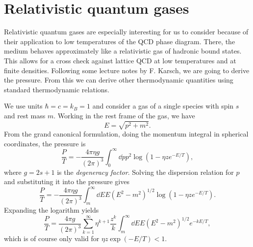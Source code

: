 \section{Relativistic quantum gases}

Relativistic quantum gases are especially interesting for us
to consider because of their
application to low temperatures of the QCD phase diagram. There, the medium
behaves approximately like a relativistic gas of hadronic bound states.
This allows for a cross check against lattice QCD at low temperatures
and at finite densities. Following some lecture notes by F. Karsch,
we are going to derive the
pressure. From this we can derive other thermodynamic quantities
using standard thermodynamic relations.

We use units $\hbar=c=k_B=1$ and consider a gas of a single species
with spin $s$ and rest mass $m$. Working in the rest frame of the gas,
we have
\begin{equation}\label{eq:dispersion}
  E=\sqrt{p^2+m^2}.  
\end{equation}
From the grand canonical formulation,
doing the momentum integral in spherical coordinates, the pressure is
\begin{equation}
  \frac{P}{T}=-\frac{4\pi\eta g}{(2\pi)^3}\int_0^\infty 
      \dd{p}p^2\log\left(1-\eta z e^{-E/T}\right),
\end{equation}
where $g=2s+1$ is the {\it degeneracy factor}. 
Solving the dispersion relation
for $p$ and substituting it into the pressure gives
\begin{equation}
  \frac{P}{T}=-\frac{4\pi\eta g}{(2\pi)^3}\int_m^\infty 
      \dd{E}E\left(E^2-m^2\right)^{1/2}\log\left(1-\eta z e^{-E/T}\right).
\end{equation}
Expanding the logarithm yields
\begin{equation}\label{eq:pressE}
  \frac{P}{T}=\frac{4\pi g}{(2\pi)^3}\sum_{k=1}^\infty\eta^{k+1}\frac{z^k}{k}\int_m^\infty 
      \dd{E}E\left(E^2-m^2\right)^{1/2}e^{-kE/T},
\end{equation}
which is of course only valid for $\eta z\exp(-E/T)<1$.


